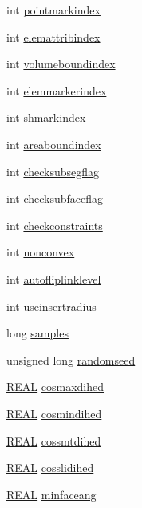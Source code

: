 \begin{DoxyCompactItemize}
int \hyperlink{classtetgenmesh_a0da665af737fd8d5db7b7e8d6f97d325}{pointmarkindex}
\item 
int \hyperlink{classtetgenmesh_a52dfc8427820c4f4d2c3209b05897b3f}{elemattribindex}
\item 
int \hyperlink{classtetgenmesh_afbc49fd2c3c19c8725ea89348440e58b}{volumeboundindex}
\item 
int \hyperlink{classtetgenmesh_a7aa641823e09c9762b497ed098133e70}{elemmarkerindex}
\item 
int \hyperlink{classtetgenmesh_a95a36881e979fdd33fce53dfe621dd27}{shmarkindex}
\item 
int \hyperlink{classtetgenmesh_abf62aababba80f7b7f19fa28151573d4}{areaboundindex}
\item 
int \hyperlink{classtetgenmesh_a3526f3e3bbe8d630feb0815f1918385a}{checksubsegflag}
\item 
int \hyperlink{classtetgenmesh_acb8eb61f03880557af465a726797c2df}{checksubfaceflag}
\item 
int \hyperlink{classtetgenmesh_a96fba71b8476fa4423702eeb94631383}{checkconstraints}
\item 
int \hyperlink{classtetgenmesh_ab92b76b15a48ed42db8db49dc2b3a651}{nonconvex}
\item 
int \hyperlink{classtetgenmesh_a18729c9c93774bdb0397f9181ddc9609}{autofliplinklevel}
\item 
int \hyperlink{classtetgenmesh_a45386c7a807521fadc994a0be99df405}{useinsertradius}
\item 
long \hyperlink{classtetgenmesh_a0f1e1bd695df6ce04f21329a585e1b84}{samples}
\item 
unsigned long \hyperlink{classtetgenmesh_a7a81e8968d62ee9b09fb4b3df9acddd5}{randomseed}
\item 
\hyperlink{tetgen_8h_a4b654506f18b8bfd61ad2a29a7e38c25}{R\-E\-A\-L} \hyperlink{classtetgenmesh_a9f7eadf1045c2b4c1c97438077609e8f}{cosmaxdihed}
\item 
\hyperlink{tetgen_8h_a4b654506f18b8bfd61ad2a29a7e38c25}{R\-E\-A\-L} \hyperlink{classtetgenmesh_a0e58e1614215c6ec5886fb85692a9f04}{cosmindihed}
\item 
\hyperlink{tetgen_8h_a4b654506f18b8bfd61ad2a29a7e38c25}{R\-E\-A\-L} \hyperlink{classtetgenmesh_ad551e8a0e3089c279a782a721e031346}{cossmtdihed}
\item 
\hyperlink{tetgen_8h_a4b654506f18b8bfd61ad2a29a7e38c25}{R\-E\-A\-L} \hyperlink{classtetgenmesh_a5dbb7eb25c4da3be88fe6d643bcc0e84}{cosslidihed}
\item 
\hyperlink{tetgen_8h_a4b654506f18b8bfd61ad2a29a7e38c25}{R\-E\-A\-L} \hyperlink{classtetgenmesh_a6baefb6eda35b7b77f6b065425ee8247}{minfaceang}

\end{DoxyCompactItemize}
